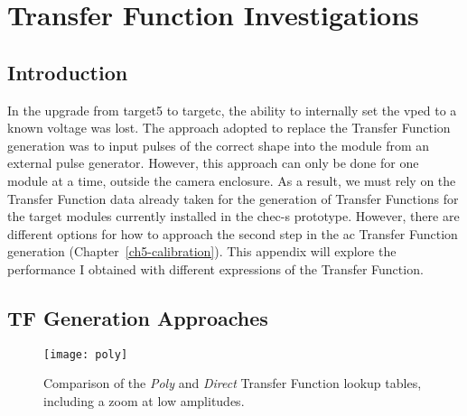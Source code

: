 \chapter{\label{a4-tf}Transfer Function Investigations}

\minitoc

\section{Introduction}

In the upgrade from \gls{target5} to \gls{targetc}, the ability to internally set the \gls{vped} to a known voltage was lost. The approach adopted to replace the Transfer Function generation was to input pulses of the correct shape into the module from an external pulse generator. However, this approach can only be done for one module at a time, outside the camera enclosure. As a result, we must rely on the Transfer Function data already taken for the generation of Transfer Functions for the \gls{target} modules currently installed in the \gls{chec-s} prototype. However, there are different options for how to approach the second step in the \gls{ac} Transfer Function generation (Chapter~\ref{ch5-calibration}). This appendix will explore the performance I obtained with different expressions of the Transfer Function.

\section{TF Generation Approaches}

\begin{figure}
	\centering
	\texttt{[image: poly]} 
	\caption[Comparison of the \textit{Poly} and \textit{Direct} Transfer Function lookup tables.]{Comparison of the \textit{Poly} and \textit{Direct} Transfer Function lookup tables, including a zoom at low amplitudes.} 
	\label{fig:poly}
\end{figure}

